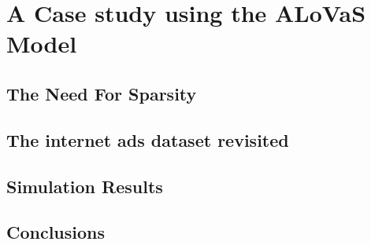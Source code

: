 
\section{A Case study using the ALoVaS Model}
\label{ch:proposed_futue_work}

\subsection{The Need For Sparsity}

\subsection{The internet ads dataset revisited}

\subsection{Simulation Results}

\subsection{Conclusions}


